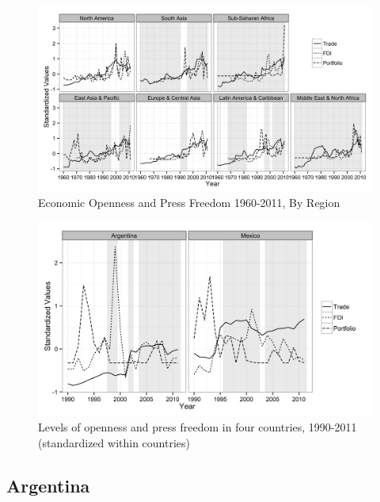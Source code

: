\documentclass[12pt]{report}
\begin{document}
\begin{centering}

\begin{figure}
\includegraphics[scale=0.2]{article2_regions.png}
\caption{Economic Openness and Press Freedom 1960-2011, By Region}
\end{figure}


\begin{figure}
\includegraphics[scale=0.2]{article2_AM_cases.png}
\caption{Levels of openness and press freedom in four countries, 1990-2011
(standardized within countries)}
\end{figure}

\end{centering}

\subsection{Argentina}
\end{document}
